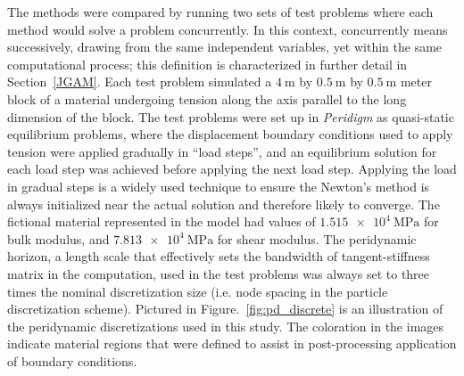 \documentclass[preprint,12pt]{elsarticle}
\begin{document}
The methods were compared by running two sets of test problems where each method would solve a problem concurrently. In this context, concurrently means successively, drawing from the same independent variables, yet within the same computational process; this definition is characterized in further detail in Section~\ref{JGAM}. Each test problem simulated a $\SI{4}{\meter}$ by $\SI{0.5}{\meter}$ by $\SI{0.5}{\meter}$ meter block of a material undergoing tension along the axis parallel to the long dimension of the block. The test problems were set up in \emph{Peridigm} as quasi-static equilibrium problems, where the displacement boundary conditions used to apply tension were applied gradually in ``load steps'', and an equilibrium solution for each load step was achieved before applying the next load step. Applying the load in gradual steps is a widely used technique to ensure the Newton's method is always initialized near the actual solution and therefore likely to converge.  The fictional material represented in the model had values of $\SI{1.515e4}{\mega\pascal}$ for bulk modulus, and $\SI{7.813e4}{\mega\pascal}$ for shear modulus. The peridynamic horizon, a length scale that effectively sets the bandwidth of tangent-stiffness matrix in the computation, used in the test problems was always set to three times the nominal discretization size (i.e.  node spacing in the particle discretization scheme). Pictured in Figure.~\ref{fig:pd_discrete} is an illustration of the peridynamic discretizations used in this study. The coloration in the images indicate material regions that were defined to assist in post-processing application of boundary conditions. 
%
\end{document}
